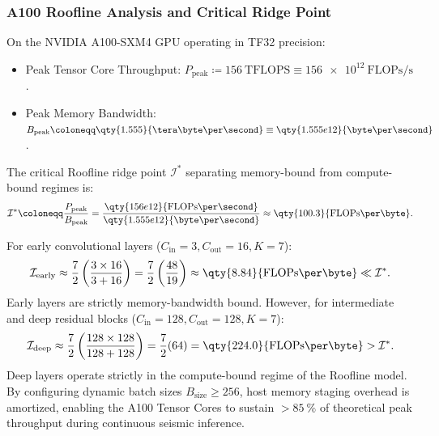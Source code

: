 \subsubsection*{A100 Roofline Analysis and Critical Ridge Point}
On the NVIDIA A100-SXM4 GPU operating in TF32 precision:
\begin{itemize}
  \item Peak Tensor Core Throughput: $P_{\mathrm{peak}} \coloneqq
    \qty{156}{\tera\text{FLOPS}} \equiv \qty{156e12}{\text{FLOPs}\per\second}$.
  \item Peak Memory Bandwidth: $B_{\mathrm{peak}} \coloneqq
    \qty{1.555}{\tera\byte\per\second} \equiv
    \qty{1.555e12}{\byte\per\second}$.
\end{itemize}
The critical Roofline ridge point $\mathcal{I}^*$ separating
memory-bound from compute-bound regimes is:
\begin{equation}
  \mathcal{I}^* \coloneqq
  \frac{P_{\mathrm{peak}}}{B_{\mathrm{peak}}} =
  \frac{\qty{156e12}{\text{FLOPs}\per\second}}{\qty{1.555e12}{\byte\per\second}}
  \approx \qty{100.3}{\text{FLOPs}\per\byte}.
  \label{eq:supp_ridge_point}
\end{equation}

\begin{remark}
  For early convolutional layers ($C_{\mathrm{in}} = 3,
  C_{\mathrm{out}} = 16, K = 7$):
  \begin{equation}
    \mathcal{I}_{\mathrm{early}} \approx \frac{7}{2} \left( \frac{3
    \times 16}{3 + 16} \right) = \frac{7}{2} \left( \frac{48}{19}
    \right) \approx \qty{8.84}{\text{FLOPs}\per\byte} \ll \mathcal{I}^*.
  \end{equation}
  Early layers are strictly memory-bandwidth bound.
  However, for intermediate and deep residual blocks
  ($C_{\mathrm{in}} = 128, C_{\mathrm{out}} = 128, K = 7$):
  \begin{equation}
    \mathcal{I}_{\mathrm{deep}} \approx \frac{7}{2} \left( \frac{128
    \times 128}{128 + 128} \right) = \frac{7}{2} (64) =
    \qty{224.0}{\text{FLOPs}\per\byte} > \mathcal{I}^*.
  \end{equation}
  Deep layers operate strictly in the compute-bound regime of the
  Roofline model.
  By configuring dynamic batch sizes $B_{\mathrm{size}} \ge
  \num{256}$, host memory staging overhead is amortized,
  enabling the A100 Tensor Cores to sustain $> \qty{85}{\percent}$
  of theoretical peak throughput during continuous
  seismic inference.
\end{remark}
